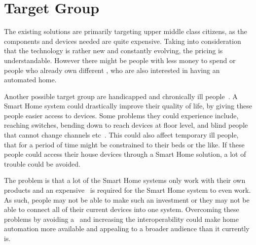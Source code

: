 \section{Target Group} \label{sec:target-group}

The existing solutions are primarily targeting upper middle class citizens, as the components and devices needed are quite expensive. Taking into consideration that the technology is rather new and constantly evolving, the pricing is understandable. However there might be people with less money to spend or people who already own different \sdevs, who are also interested in having an automated home.

Another possible target group are handicapped and chronically ill people~\citep{overview-smart-home-environment}. A Smart Home system could drastically improve their quality of life, by giving these people easier access to devices. Some problems they could experience include, reaching switches, bending down to reach devices at floor level, and blind people that cannot change channels etc~\citep{disabled-smart-home}. This could also affect temporary ill people, that for a period of time might be constrained to their beds or the like. If these people could access their house devices through a Smart Home solution, a lot of trouble could be avoided. 

The problem is that a lot of the Smart Home systems only work with their own products and an expensive \hub~is required for the Smart Home system to even work. As such, people may not be able to make such an investment or they may not be able to connect all of their current devices into one system. Overcoming these problems by avoiding a \hub~and increasing the interoperability could make home automation more available and appealing to a broader audience than it currently is. 

